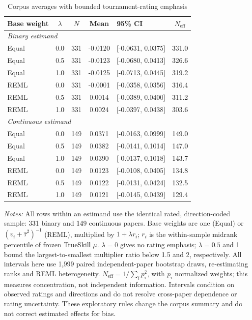 \begin{table}[htbp]\centering\small
\caption{Corpus averages with bounded tournament-rating emphasis}\label{tab:quality_weights}
\setlength{\tabcolsep}{4pt}
\begin{tabular}{lccclc}\toprule
Base weight & $\lambda$ & $N$ & Mean & 95\% CI & $N_{\mathrm{eff}}$ \\
\midrule
\multicolumn{6}{l}{\textit{Binary estimand}} \\
Equal & 0.0 & 331 & -0.0120 & [-0.0631, 0.0375] & 331.0 \\
Equal & 0.5 & 331 & -0.0123 & [-0.0680, 0.0413] & 326.6 \\
Equal & 1.0 & 331 & -0.0125 & [-0.0713, 0.0445] & 319.2 \\
REML & 0.0 & 331 & -0.0001 & [-0.0358, 0.0356] & 316.4 \\
REML & 0.5 & 331 & 0.0014 & [-0.0389, 0.0400] & 311.2 \\
REML & 1.0 & 331 & 0.0024 & [-0.0397, 0.0438] & 303.6 \\
\multicolumn{6}{l}{\textit{Continuous estimand}} \\
Equal & 0.0 & 149 & 0.0371 & [-0.0163, 0.0999] & 149.0 \\
Equal & 0.5 & 149 & 0.0382 & [-0.0141, 0.1014] & 147.0 \\
Equal & 1.0 & 149 & 0.0390 & [-0.0137, 0.1018] & 143.7 \\
REML & 0.0 & 149 & 0.0123 & [-0.0108, 0.0405] & 134.8 \\
REML & 0.5 & 149 & 0.0122 & [-0.0131, 0.0424] & 132.5 \\
REML & 1.0 & 149 & 0.0121 & [-0.0145, 0.0439] & 129.4 \\
\bottomrule\end{tabular}
\par\vspace{4pt}\begin{minipage}{\textwidth}\footnotesize
\textit{Notes:} All rows within an estimand use the identical rated, direction-coded sample: 331 binary and 149 continuous papers. Base weights are one (Equal) or $(v_i+\widehat\tau^2)^{-1}$ (REML), multiplied by $1+\lambda r_i$; $r_i$ is the within-sample midrank percentile of frozen TrueSkill $\mu$. $\lambda=0$ gives no rating emphasis; $\lambda=0.5$ and 1 bound the largest-to-smallest multiplier ratio below 1.5 and 2, respectively. All intervals here use 1,999 paired independent-paper bootstrap draws, re-estimating ranks and REML heterogeneity. $N_{\mathrm{eff}}=1/\sum_i p_i^2$, with $p_i$ normalized weights; this measures concentration, not independent information. Intervals condition on observed ratings and directions and do not resolve cross-paper dependence or rating uncertainty. These exploratory rules change the corpus summary and do not correct estimated effects for bias.
\end{minipage}
\end{table}
